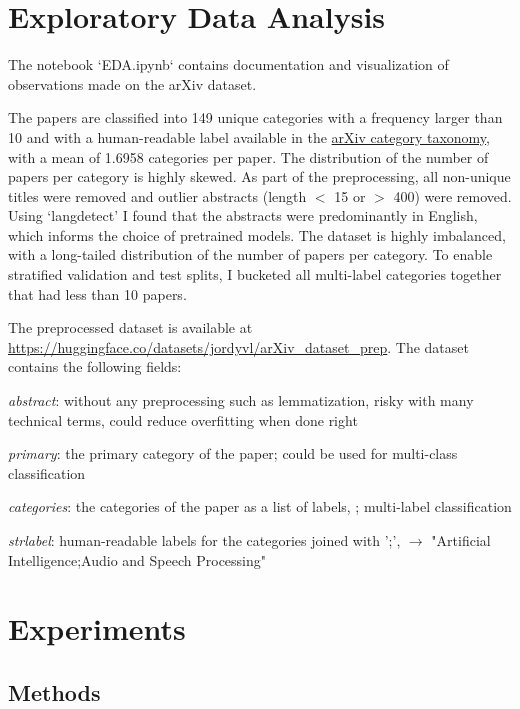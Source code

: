 \documentclass[11pt,letterpaper]{article}
\begin{document}
\section{Exploratory Data Analysis}

The notebook `EDA.ipynb` contains documentation and visualization of observations made on the arXiv dataset.

The papers are classified into 149 unique categories with a frequency larger than 10 and with a human-readable label available in the \href{https://arxiv.org/category_taxonomy}{arXiv category taxonomy}, with a mean of 1.6958 categories per paper. The distribution of the number of papers per category is highly skewed.
As part of the preprocessing, all non-unique titles were removed and outlier abstracts (length $<$ 15 or $>$ 400) were removed. Using `langdetect' I found that the abstracts were predominantly in English, which informs the choice of pretrained models. The dataset is highly imbalanced, with a long-tailed distribution of the number of papers per category. To enable stratified validation and test splits, I bucketed all multi-label categories together that had less than 10 papers.

The preprocessed dataset is available at \url{https://huggingface.co/datasets/jordyvl/arXiv_dataset_prep}. The dataset contains the following fields:
\begin{simplist}
  \item \textit{abstract}: without any preprocessing such as lemmatization, risky with many technical terms, could reduce overfitting when done right
  \item \textit{primary}: the primary category of the paper; could be used for multi-class classification
  \item \textit{categories}: the categories of the paper as a list of labels, \eg [cs.AI, eess.AS]; multi-label classification
  \item \textit{strlabel}: human-readable labels for the categories joined with ';', \eg [cs.AI, eess.AS]  $\to$ "Artificial Intelligence;Audio and Speech Processing"
\end{simplist}


\section{Experiments}

\subsection{Methods}
\end{document}
